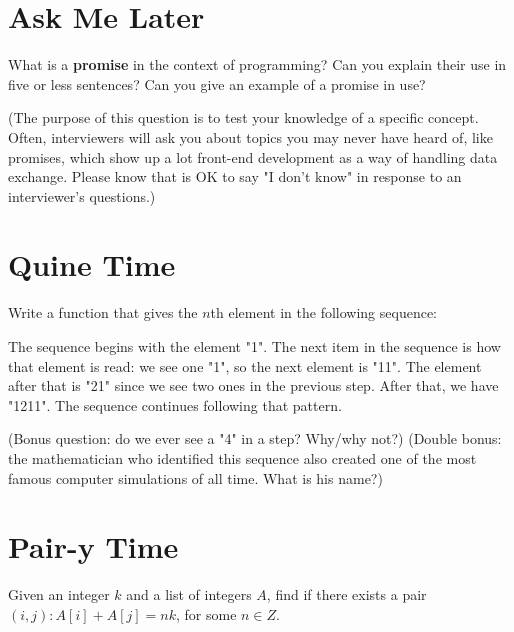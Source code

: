 \documentclass[12pt,runningheads]{article}
\begin{document}
\newpage

\section{Ask Me Later}
What is a \textbf{promise} in the context of programming? Can you explain their use in five or less sentences? Can you give an example of a promise in use?

(The purpose of this question is to test your knowledge of a specific concept. Often, interviewers will ask you about topics you may never have heard of, like promises, which show up a lot front-end development as a way of handling data exchange. Please know that is OK to say "I don't know" in response to an interviewer's questions.) 
\newpage

\section{Quine Time}
Write a function that gives the $n$th element in the following sequence:

The sequence begins with the element "1". The next item in the sequence is how that element is read: we see one "1", so the next element is "11". The element after that is "21" since we see two ones in the previous step. After that, we have "1211". The sequence continues following that pattern.

(Bonus question: do we ever see a "4" in a step? Why/why not?) (Double bonus: the mathematician who identified this sequence also created one of the most famous computer simulations of all time. What is his name?)

\begin{comment}
def read(num):
    s = str(num)
    l = len(s)
    res = ''
    rpt = 0
    chr = s[0]
    i = 0
    
    for i in range(l):
        if s[i] == chr:
            rpt += 1
        else:
            res += str(rpt) + chr
            rpt = 1
            chr = s[i]
    
    if rpt >= 1:
        res += str(rpt) + chr
    
    return int(res)
    
num = 1
ctr = 1
lim = 15

while ctr != lim:
    print(num)
    num = read(num)
    ctr += 1

\end{comment}

\newpage

\section{Pair-y Time}
Given an integer $k$ and a list of integers $A$, find if there exists a pair $(i, j): A[i] + A[j] = nk$, for some $n \in Z$.
\begin{comment}
First mod everything by k. Then use a hash or array to find pairs that sum to "0" = k.
\end{comment}
\end{document}
